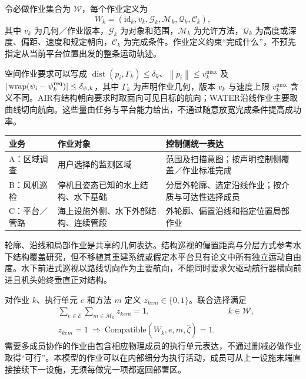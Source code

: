 \documentclass[UTF8,fontset=fandol,a4paper,11pt]{ctexart}
\newcommand{\norm}[1]{\left\lVert #1\right\rVert}
\newcommand{\dist}{\operatorname{dist}}
\newcommand{\wrap}{\operatorname{wrap}}
\begin{document}
令必做作业集合为 $\mathcal W$，每个作业定义为
\begin{equation}
 W_k=(\mathrm{id}_k,v_k,\mathcal G_k,\mathcal M_k,
        \mathcal Q_k,\mathcal C_k),
 \label{eq:work}
\end{equation}
其中 $v_k$ 为几何／作业版本，$\mathcal G_k$ 为对象和范围，$\mathcal M_k$ 为允许方法，$\mathcal Q_k$ 为高度或深度、偏距、速度和规定朝向，$\mathcal C_k$ 为完成条件。作业定义约束“完成什么”，不预先指定从当前平台位置出发的整条运动轨迹。

空间作业要求可以写成 $\dist(p_i,\Gamma_k)\leq\delta_k$、$\norm{\dot p_i}\leq v_k^{\max}$ 及 $|\wrap(\psi_i-\psi_k^{\rm req})|\leq\delta_{\psi,k}$，其中 $\Gamma_k$ 为声明作业几何，版本 $v_k$ 与速度上限 $v_k^{\max}$ 含义不同。AIR有结构朝向要求时取面向可见目标的航向；WATER沿线作业主要取曲线切向航向。这些量由任务与平台能力给出，不通过随意放宽完成条件提高成功率。

\begin{center}
\small
\begin{tabular}{p{}p{}p{}}
\toprule
业务 & 作业对象 & 控制侧统一表达 \\
\midrule
A：区域调查 & 用户选择的监测区域 & 范围及扫描意图；按声明控制侧覆盖／作业标准完成 \\
B：风机巡检 & 停机且姿态已知的水上结构、水下基础 & 分层外轮廓、选定沿线作业；按介质与可达性选择成员 \\
C：平台／管路 & 海上设施外侧、水下外部结构、连续管段 & 外轮廓、偏置沿线和指定位置局部作业 \\
\bottomrule
\end{tabular}
\end{center}

轮廓、沿线和局部作业是共享的几何表达。结构巡视的偏置距离与分层方式参考水下结构覆盖研究\cite{galceran}，但不移植其重建系统或假定本平台具有论文中所有独立运动自由度。水下前进式巡视以路线切向作为主要航向，不能同时要求欠驱动航行器横向前进且机头始终垂直正对结构。

对作业 $k$、执行单元 $e$ 和方法 $m$ 定义 $z_{kem}\in\{0,1\}$。联合选择满足
\begin{align}
 &\sum_{e\in\mathcal E}\sum_{m\in\mathcal M_k}z_{kem}=1,
       &&k\in\mathcal W,\label{eq:assignment}\\
 &z_{kem}=1\ \Longrightarrow\
   \mathrm{Compatible}(W_k,e,m,\widehat\zeta)=1.
       \label{eq:compatibility}
\end{align}
需要多成员协作的作业由包含相应物理成员的执行单元表达，不通过删减必做作业取得“可行”。本模型的作业可以在内部细分为执行活动，成员可从上一设施末端直接接续下一设施，无须每做完一项都返回部署区。
\end{document}
